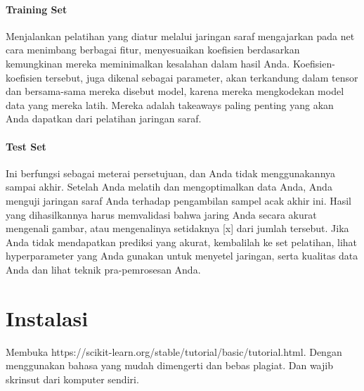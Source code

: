 \paragraph{Training Set} \hspace{0pt} \par
Menjalankan pelatihan yang diatur melalui jaringan saraf mengajarkan pada net cara menimbang berbagai fitur, menyesuaikan koefisien berdasarkan kemungkinan mereka meminimalkan kesalahan dalam hasil Anda.
Koefisien-koefisien tersebut, juga dikenal sebagai parameter, akan terkandung dalam tensor dan bersama-sama mereka disebut model, karena mereka mengkodekan model data yang mereka latih. Mereka adalah takeaways paling penting yang akan Anda dapatkan dari pelatihan jaringan saraf.

\paragraph{Test Set} \hspace{0pt} \par
Ini berfungsi sebagai meterai persetujuan, dan Anda tidak menggunakannya sampai akhir. Setelah Anda melatih dan mengoptimalkan data Anda, Anda menguji jaringan saraf Anda terhadap pengambilan sampel acak akhir ini. Hasil yang dihasilkannya harus memvalidasi bahwa jaring Anda secara akurat mengenali gambar, atau mengenalinya setidaknya [x] dari jumlah tersebut. Jika Anda tidak mendapatkan prediksi yang akurat, kembalilah ke set pelatihan, lihat hyperparameter yang Anda gunakan untuk menyetel jaringan, serta kualitas data Anda dan lihat teknik pra-pemrosesan Anda.


\section{Instalasi}
Membuka https://scikit-learn.org/stable/tutorial/basic/tutorial.html. Dengan menggunakan bahasa yang mudah dimengerti dan bebas plagiat. 
Dan wajib skrinsut dari komputer sendiri.
